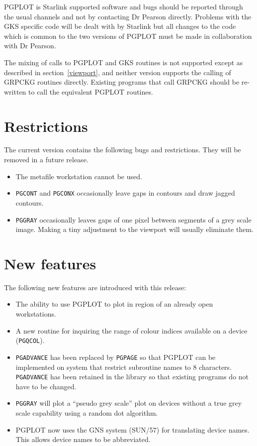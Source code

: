 PGPLOT is Starlink supported software and bugs should be reported through the
usual channels and not by contacting Dr Pearson directly. Problems with the GKS
specific code will be dealt with by Starlink but all changes to the code which
is common to the two versions of PGPLOT must be made in collaboration with Dr
Pearson.

The mixing of calls to PGPLOT and GKS routines is not supported except as
described in section~\ref{viewport}, and neither
version supports the calling of GRPCKG routines directly. Existing programs
that call GRPCKG should be re-written to call the equivalent PGPLOT routines.

\section{Restrictions}

The current version contains the following bugs and restrictions. They will
be removed in a future release.
\begin{itemize}
\item The metafile workstation cannot be used.
\item {\tt PGCONT} and {\tt PGCONX} occasionally leave gaps in contours and 
draw jagged contours.
\item {\tt PGGRAY} occasionally leaves gaps of one pixel between segments of a
grey scale image. Making a tiny adjustment to the viewport will usually
eliminate them.
\end{itemize}

\section{New features}
The following new features are introduced with this release:
\begin{itemize}
\item The ability to use PGPLOT to plot in region of an already open
workstations.
\item A new routine for inquiring the range of colour indices available on a
device ({\tt PGQCOL}).
\item {\tt PGADVANCE} has been replaced by {\tt PGPAGE} so that PGPLOT can be
implemented on system that restrict subroutine names to 8 characters. {\tt
PGADVANCE} has been retained in the library so that existing programs do not
have to be changed.
\item {\tt PGGRAY} will plot a ``pseudo grey scale'' plot on devices without a
true grey scale capability using a random dot algorithm.
\item PGPLOT now uses the GNS system (SUN/57) for translating device
names. This allows device names to be abbreviated.
\end{itemize}

